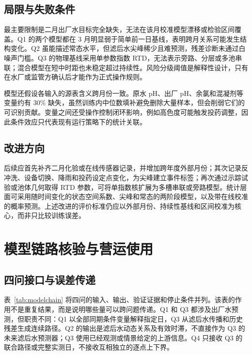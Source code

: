 \documentclass[UTF8,12pt,a4paper]{ctexart}
\begin{document}
\subsection{局限与失败条件}

最主要限制是二月出厂水目标完全缺失，无法在该月校准模型漂移或检验区间覆盖。Q1 的两个模型都在 3 月明显弱于简单前一日基线，表明跨月关系可能发生结构变化。Q2 虽能描述常态水平，但滤后水尖峰稀少且难预测，残差诊断未通过白噪声门槛。Q3 的物理基线采用单参数指数 RTD，无法表示旁路、分层或多池串联；混合模型在短中时距也未稳定超过持续性。风险分级阈值是解释性设计，只有在水厂或监管方确认后才能作为正式操作规则。

模型还假设各输入的源表含义跨月份一致。原水 pH、出厂 pH、余氯和混凝剂等变量约有 30\% 缺失，虽然训练内中位数填补避免删除大量样本，但会削弱它们的可识别贡献。变量之间还受操作控制闭环影响，例如高色度可能触发投药调整，因此条件效应只代表现有运行策略下的统计关联。

\subsection{改进方向}

后续应首先补齐二月化验或在线传感器记录，并增加跨年度外部月份；其次记录反冲洗、设备切换、降雨和投药设定点变化，为尖峰建立事件标签；再次通过示踪试验或池体几何取得 RTD 参数，可将单指数核扩展为多槽串联或旁路模型。统计层面可采用随时间变化的状态空间系数、尖峰和常态的两阶段模型，以及带在线校准的概率预测。上述改进的评价标准仍应以外部月份、持续性基线和区间校准为核心，而非只比较训练误差。

\section{模型链路核验与营运使用}

\subsection{四问接口与误差传递}

表~\ref{tab:modelchain} 将四问的输入、输出、验证证据和停止条件并列。该表的作用不是重复结果，而是说明哪些量可以跨问题传递。Q1 和 Q3 都涉及出厂水预测，但职责不同：Q1 以全部同期条件变量解释指定日，Q3 从滤后水传播和历史残差生成连续路径。Q2 的输出是滤后水动态关系及有效时滞，不直接作为 Q3 的未来滤后水预测器；Q3 使用已经观测或情景给定的上游信息。Q4 只接收 Q3 的联合路径或完整实测日，不接收互相独立的逐点上下界。
\end{document}
